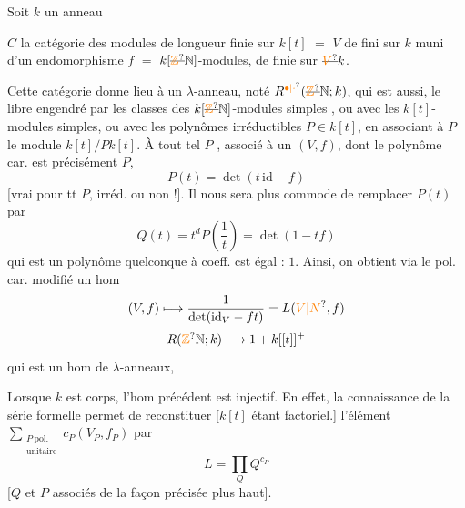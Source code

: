 Soit $k$ un  anneau

  $C$ la catégorie des modules de longueur finie sur $k[t]$ $=$  $V$  de  fini sur $k$ muni d'un endomorphisme $f$ $=$ $k[\deleted{\unsure{\mathbb{Z}}}\mathbb{N}]$-modules,  de  finie sur $\deleted{\unsure{V}}k$.

Cette catégorie donne lieu à un $\lambda$-anneau, noté $R^{\unsure{\bullet|\cdot}}(\deleted{\unsure{\mathbb{Z}}}\mathbb{N};k)$, qui est aussi,  le   libre engendré par les classes des $k[\deleted{\unsure{\mathbb{Z}}}\mathbb{N}]$-modules simples , ou avec les $k[t]$-modules simples, ou avec les polynômes  irréductibles $P\in k[t]$, en associant à $P$ le module $k[t]/Pk[t]$. À tout tel $P$ ,  associé à un $(V,f)$, dont le polynôme car. est précisément $P$,
\[
P(t)=\det(t\,\mathrm{id}-f)
\]
[vrai pour tt $P$, irréd. ou non !]. Il nous sera plus commode de remplacer $P(t)$ par
\[
Q(t)=t^dP\left(\frac{1}{t}\right)=\det(1-tf)
\]
qui est un polynôme quelconque à coeff. cst égal : $1$.
Ainsi, on obtient via le pol. car. modifié un hom
\[
(V,f)\longmapsto\frac{1}{\det(\mathrm{id}_V-ft)}=L(\unsure{V|N},f)
\]
\[
R(\deleted{\unsure{\mathbb{Z}}}\mathbb{N};k)\longrightarrow 1+k[[t]]^+
\]
qui  est un hom de $\lambda$-anneaux,

Lorsque $k$ est  corps, l'hom précédent est injectif. En effet,   la connaissance de la série formelle permet de reconstituer   [$k[t]$ étant factoriel.] l'élément $\sum_{\substack{P\ \mathrm{pol.}\\\text{unitaire}}}c_P(V_P,f_P)$  par
\[
L=\prod_Q Q^{c_P}
\]
[$Q$ et $P$ associés de la façon précisée plus haut].


